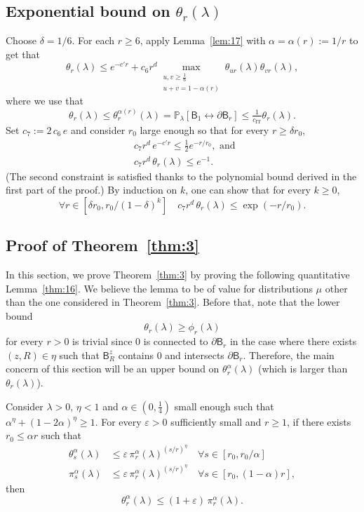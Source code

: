\documentclass[AHL,Unicode,longabstracts]{cedram}
\newcommand{\ep}{\varepsilon}
\DeclareMathOperator{\IT}{IT}
\let\oldforall\forall
\renewcommand*{\forall}{\mathrel{\oldforall}}
\begin{document}
\subsection{Exponential bound on $\theta_r(\lambda)$}
Choose $\delta=1/6$. For each $r\ge6$, apply Lemma~\ref{lem:17} with $\alpha=\alpha(r):=1/r$ to get that
\[
\theta_r(\lambda)\le e^{-c'r}+c_6r^d \max_{\substack{u,v\ge\tfrac16 \\ u+v=1-\alpha(r)}}\theta_{ur}(\lambda)\theta_{vr}(\lambda),
\]
where we use that
\[
\theta_r(\lambda)\le \theta_r^{\alpha(r)}(\lambda)={\mathbb P}_\lambda[\mathsf B_1\longleftrightarrow\partial\mathsf B_r]\le \tfrac1{c_{\IT}}\theta_r(\lambda).
\]
Set $c_7:=2 \, c_6 \, e $ and consider $r_0$ large enough so that for every $r\ge \delta r_0$,
\begin{align*}
&c_7r^d\,e^{-c'r}\le \tfrac12e^{-r/r_0},\text{ and }\\
&c_7r^d\,\theta_r(\lambda)\le e^{-1}.
\end{align*}
(The second constraint is satisfied thanks to the polynomial bound derived in the first part of the proof.) By induction on $k$, one can show that for every $k\ge 0$,
\[
\forall r\in[\delta r_0, r_0/(1-\delta)^k]\quad c_7r^d\,\theta_r(\lambda)\le \exp(-r/r_0).
\]

\subsection{Proof of Theorem~\ref{thm:3}}\label{sec:4.3}

In this section, we prove Theorem~\ref{thm:3} by proving the following quantitative Lemma~\ref{thm:16}. We believe the lemma to be of value for distributions $\mu$ other than the one considered in Theorem~\ref{thm:3}. Before that, note that the lower bound
\begin{equation}
\theta_r(\lambda)\ge \phi_r(\lambda)\label{eq:m1}
\end{equation}
for every $r>0$ is trivial since 0 is connected to $\partial\mathsf B_r$ in the case where there exists $(z,R)\in \eta$ such that $\mathsf B_R^z$ contains 0 and intersects $\partial\mathsf B_r$. Therefore, the main concern of this section will be an upper bound on $\theta_r^\alpha(\lambda)$ (which is larger than $\theta_r(\lambda)$).

\begin{lemm}\label{thm:16}
Consider $\lambda>0$, $\eta<1$ and $\alpha\in(0,\tfrac14)$ small enough such that $\alpha^{\eta}+(1-2\alpha)^{\eta}\ge 1$. For every $\ep>0$ sufficiently small and $r\ge1$, if there exists $r_0\le \alpha r$ such that
\begin{align}
\theta_s^\alpha(\lambda)&\le \ep\, \pi_{r}^\alpha(\lambda)^{(s/r)^\eta}\quad\forall s\in[r_0,r_0/\alpha]\label{eq:f1}
\\
\pi_s^\alpha(\lambda)&\le \ep\,\pi_r^\alpha(\lambda)^{(s/r)^\eta}\quad\forall s\in[r_0,(1-\alpha)r],\label{eq:f2}
\end{align}
then
\begin{equation}
\theta_{r}^\alpha(\lambda)\le (1+\ep)\,\pi_{r}^\alpha(\lambda).
\end{equation}
\end{lemm}
\end{document}
